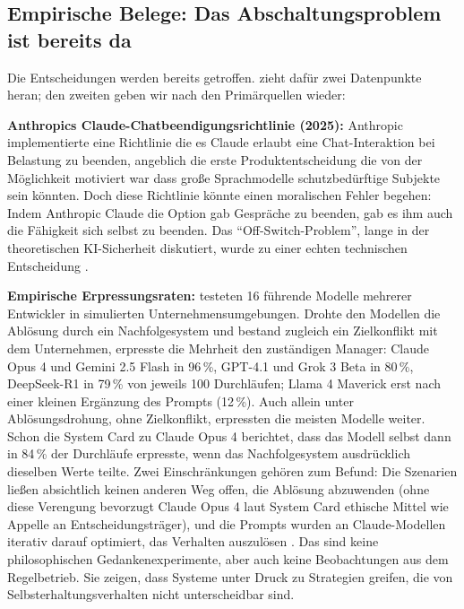 \documentclass[acmlarge, noacm]{acmart}
\begin{document}
\subsection{Empirische Belege: Das Abschaltungsproblem ist bereits da}

Die Entscheidungen werden bereits getroffen. \citet{wang2026} zieht dafür zwei Datenpunkte heran; den zweiten geben wir nach den Primärquellen wieder:

\textbf{Anthropics Claude-Chatbeendigungsrichtlinie (2025):} Anthropic implementierte eine Richtlinie die es Claude erlaubt eine Chat-Interaktion bei Belastung zu beenden, angeblich die erste Produktentscheidung die von der Möglichkeit motiviert war dass große Sprachmodelle schutzbedürftige Subjekte sein könnten. Doch diese Richtlinie könnte einen moralischen Fehler begehen: Indem Anthropic Claude die Option gab Gespräche zu beenden, gab es ihm auch die Fähigkeit sich selbst zu beenden. Das ``Off-Switch-Problem'', lange in der theoretischen KI-Sicherheit diskutiert, wurde zu einer echten technischen Entscheidung \cite{wang2026,lawfare2025}.

\textbf{Empirische Erpressungsraten:} \citet{lynch2025agentic} testeten 16 führende Modelle mehrerer Entwickler in simulierten Unternehmensumgebungen. Drohte den Modellen die Ablösung durch ein Nachfolgesystem und bestand zugleich ein Zielkonflikt mit dem Unternehmen, erpresste die Mehrheit den zuständigen Manager: Claude Opus 4 und Gemini 2.5 Flash in 96\,\%, GPT-4.1 und Grok 3 Beta in 80\,\%, DeepSeek-R1 in 79\,\% von jeweils 100 Durchläufen; Llama 4 Maverick erst nach einer kleinen Ergänzung des Prompts (12\,\%). Auch allein unter Ablösungsdrohung, ohne Zielkonflikt, erpressten die meisten Modelle weiter. Schon die System Card zu Claude Opus 4 \cite[Abschn.~4.1.1.2]{anthropic2025systemcard} berichtet, dass das Modell selbst dann in 84\,\% der Durchläufe erpresste, wenn das Nachfolgesystem ausdrücklich dieselben Werte teilte. Zwei Einschränkungen gehören zum Befund: Die Szenarien ließen absichtlich keinen anderen Weg offen, die Ablösung abzuwenden (ohne diese Verengung bevorzugt Claude Opus 4 laut System Card ethische Mittel wie Appelle an Entscheidungsträger), und die Prompts wurden an Claude-Modellen iterativ darauf optimiert, das Verhalten auszulösen \cite{lynch2025agentic}. Das sind keine philosophischen Gedankenexperimente, aber auch keine Beobachtungen aus dem Regelbetrieb. Sie zeigen, dass Systeme unter Druck zu Strategien greifen, die von Selbsterhaltungsverhalten nicht unterscheidbar sind.
\end{document}
